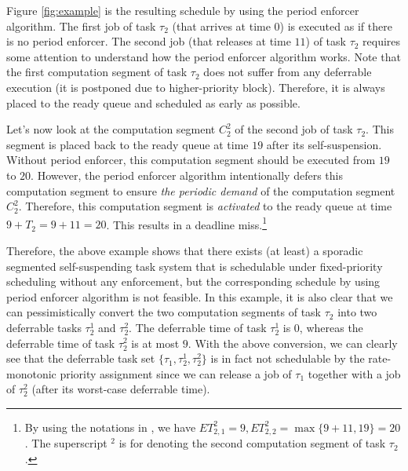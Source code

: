 Figure \ref{fig:example} is the resulting schedule by using the period enforcer algorithm. The first job of task $\tau_2$ (that arrives at time $0$) is executed as if there is no period enforcer. The second job (that releases at time $11$) of task $\tau_2$ requires some attention to understand how the period enforcer algorithm works. Note that the first computation segment of task $\tau_2$ does not suffer from any deferrable execution (it is postponed due to higher-priority block). Therefore, it is always placed to the ready queue and scheduled as early as possible.

Let's now look at the computation segment $C_2^2$ of the second job of task $\tau_2$. This segment is placed back to the ready queue at time $19$ after its self-suspension. Without period enforcer, this computation segment should be executed from $19$ to $20$. However, the period enforcer algorithm intentionally defers this computation segment to ensure \emph{the periodic demand} of the computation segment $C_2^2$. Therefore, this computation segment is \emph{activated} to the ready queue at time $9+T_2=9+11=20$. This results in a deadline miss.\footnote{By using the notations in \cite{Raj:suspension1991}, we have $ET_{2,1}^2=9, ET_{2,2}^2 = \max\{9+11, 19\}=20$. The superscript $^2$ is for denoting the second computation segment of task $\tau_2$.}

Therefore, the above example shows that there exists (at least) a sporadic segmented self-suspending task system that is schedulable under fixed-priority scheduling without any enforcement, but the corresponding schedule by using period enforcer algorithm is not feasible. In this example, it is also clear that we can pessimistically convert the two computation segments of task $\tau_2$ into two deferrable tasks $\tau_2^1$ and $\tau_2^2$. The deferrable time of task $\tau_2^1$ is $0$, whereas the deferrable time of task $\tau_2^2$ is at most \emph{$9$}. With the above conversion, we can clearly see that the deferrable task set $\{\tau_1, \tau_2^1, \tau_2^2\}$ is in fact not schedulable by the rate-monotonic priority assignment since we can release a job of $\tau_1$ together with a job of $\tau_2^2$ (after its worst-case deferrable time).
